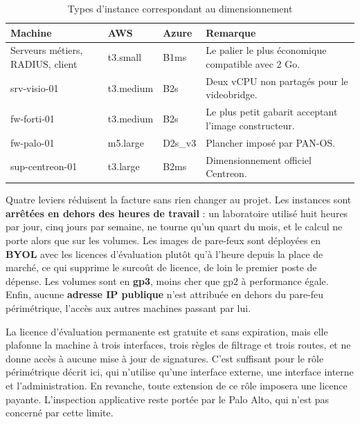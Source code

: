 \documentclass[11pt,a4paper]{article}
\begin{document}
\begin{table}[H]
\centering
\caption{Types d'instance correspondant au dimensionnement}
\begin{tabularx}{\textwidth}{L{4.2cm} L{3.0cm} L{3.0cm} Y}
\toprule
{}\textbf{Machine} & \textbf{AWS} & \textbf{Azure} & \textbf{Remarque} \\
\midrule
Serveurs métiers, RADIUS, client & \ttfamily t3.small & \ttfamily B1ms & Le palier le plus économique compatible avec 2 Go. \\
\ttfamily srv-visio-01 & \ttfamily t3.medium & \ttfamily B2s & Deux vCPU non partagés pour le videobridge. \\
\ttfamily fw-forti-01 & \ttfamily t3.medium & \ttfamily B2s & Le plus petit gabarit acceptant l'image constructeur. \\
\ttfamily fw-palo-01 & \ttfamily m5.large & \ttfamily D2s\_v3 & Plancher imposé par PAN-OS. \\
\ttfamily sup-centreon-01 & \ttfamily t3.large & \ttfamily B2ms & Dimensionnement officiel Centreon. \\
\bottomrule
\end{tabularx}
\end{table}

Quatre leviers réduisent la facture sans rien changer au projet. Les instances sont \textbf{arrêtées en dehors des heures de travail} : un laboratoire utilisé huit heures par jour, cinq jours par semaine, ne tourne qu'un quart du mois, et le calcul ne porte alors que sur les volumes. Les images de pare-feux sont déployées en \textbf{BYOL} avec les licences d'évaluation plutôt qu'à l'heure depuis la place de marché, ce qui supprime le surcoût de licence, de loin le premier poste de dépense. Les volumes sont en \textbf{gp3}, moins cher que gp2 à performance égale. Enfin, aucune \textbf{adresse IP publique} n'est attribuée en dehors du pare-feu périmétrique, l'accès aux autres machines passant par lui.

\begin{alertbox}
La licence d'évaluation permanente est gratuite et sans expiration, mais elle plafonne la machine à trois interfaces, trois règles de filtrage et trois routes, et ne donne accès à aucune mise à jour de signatures. C'est suffisant pour le rôle périmétrique décrit ici, qui n'utilise qu'une interface externe, une interface interne et l'administration. En revanche, toute extension de ce rôle imposera une licence payante. L'inspection applicative reste portée par le Palo Alto, qui n'est pas concerné par cette limite.
\end{alertbox}
\end{document}
